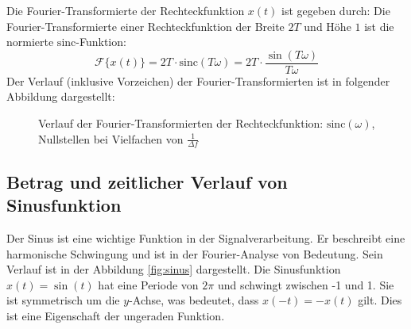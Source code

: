 Die Fourier-Transformierte der Rechteckfunktion $x(t)$ ist gegeben durch:
Die Fourier-Transformierte einer Rechteckfunktion der Breite $2T$ und Höhe $1$ ist die normierte $\mathrm{sinc}$-Funktion:
\[
\mathcal{F}\{x(t)\} = 2T \cdot \mathrm{sinc}(T\omega) = 2T \cdot \frac{\sin(T\omega)}{T\omega}
\]
Der Verlauf (inklusive Vorzeichen) der Fourier-Transformierten ist in folgender Abbildung dargestellt:

\begin{figure}[H]
    \centering
    \caption{Verlauf der Fourier-Transformierten der Rechteckfunktion: $\mathrm{sinc}(\omega)$, Nullstellen bei Vielfachen von $\frac{1}{\Delta f}$}
    \label{fig:fourier_rechteck}
\end{figure}

\subsection{Betrag und zeitlicher Verlauf von Sinusfunktion}
Der Sinus ist eine wichtige Funktion in der Signalverarbeitung.
Er beschreibt eine harmonische Schwingung und ist in der Fourier-Analyse von Bedeutung. Sein Verlauf ist in der Abbildung \ref{fig:sinus} dargestellt.
Die Sinusfunktion $x(t) = \sin(t)$ hat eine Periode von $2\pi$ und schwingt zwischen -1 und 1. Sie ist symmetrisch um die $y$-Achse, was bedeutet, dass $x(-t) = -x(t)$ gilt. Dies ist eine Eigenschaft der ungeraden Funktion.

